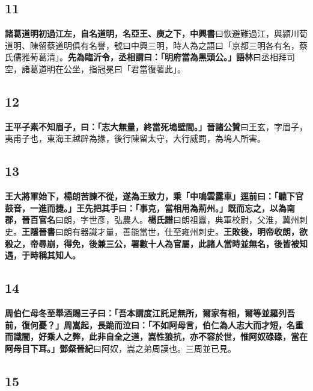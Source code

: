 \subsection*{11}

\textbf{諸葛道明初過江左，自名道明，名亞王、庾之下，}{\footnotesize \textbf{中興書}曰恢避難過江，與潁川荀道明、陳留蔡道明俱有名譽，號曰中興三明，時人為之語曰「京都三明各有名，蔡氏儒雅荀葛清」。}\textbf{先為臨沂令，丞相謂曰：「明府當為黑頭公。」}{\footnotesize \textbf{語林}曰丞相拜司空，諸葛道明在公坐，指冠冕曰「君當復著此」。}

\subsection*{12}

\textbf{王平子素不知眉子，曰：「志大無量，終當死塢壁間。」}{\footnotesize \textbf{晉諸公贊}曰王玄，字眉子，夷甫子也，東海王越辟為掾，後行陳留太守，大行威罰，為塢人所害。}

\subsection*{13}

\textbf{王大將軍始下，楊朗苦諫不從，遂為王致力，乘「中鳴雲露車」逕前曰：「聽下官鼓音，一進而捷。」王先把其手曰：「事克，當相用為荊州。」既而忘之，以為南郡，}{\footnotesize \textbf{晉百官名}曰朗，字世彥，弘農人。\textbf{楊氏譜}曰朗祖囂，典軍校尉，父淮，冀州刺史。\textbf{王隱晉書}曰朗有器識才量，善能當世，仕至雍州刺史。}\textbf{王敗後，明帝收朗，欲殺之，帝尋崩，得免，後兼三公，署數十人為官屬，此諸人當時並無名，後皆被知遇，于時稱其知人。}

\subsection*{14}

\textbf{周伯仁母冬至舉酒賜三子曰：「吾本謂度江託足無所，爾家有相，爾等並羅列吾前，復何憂？」周嵩起，長跪而泣曰：「不如阿母言，伯仁為人志大而才短，名重而識闇，好乘人之弊，此非自全之道，嵩性狼抗，亦不容於世，惟阿奴碌碌，當在阿母目下耳。」}{\footnotesize \textbf{鄧粲晉紀}曰阿奴，嵩之弟周謨也。三周並已見。}

\subsection*{15}

